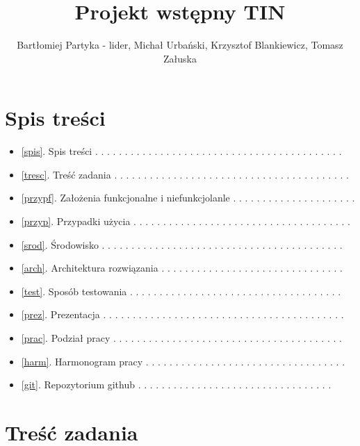 \documentclass{article}
\author{Bartłomiej Partyka - lider, Michał Urbański, Krzysztof Blankiewicz, Tomasz Załuska}
\title{Projekt wstępny TIN}
\begin{document}
\maketitle

\section{Spis treści\label{spis}}

\begin{itemize}

    \item \ref{spis}. Spis treści . . . . . . . . . . . . . . . . . . . . . . . . . . . . . . . . . . . . . . . . . . \pageref{spis}
    \item \ref{tresc}. Treść zadania . . . . . . . . . . . . . . . . . . . . . . . . . . . . . . . . . . . . . . . . \pageref{tresc}
    \item \ref{przypf}. Założenia funkcjonalne i niefunkcjolanle . . . . . . . . . . . . . . . . . . . . . \pageref{przypf}
    \item \ref{przyp}. Przypadki użycia . . . . . . . . . . . . . . . . . . . . . . . . . . . . . . . . . . . . . \pageref{przyp}
    \item \ref{srod}. Środowisko . . . . . . . . . . . . . . . . . . . . . . . . . . . . . . . . . . . . . . . . . \pageref{srod}
    \item \ref{arch}. Architektura rozwiązania . . . . . . . . . . . . . . . . . . . . . . . . . . . . . . . \pageref{arch}
    \item \ref{test}. Sposób testowania . . . . . . . . . . . . . . . . . . . . . . . . . . . . . . . . . . . . \pageref{test}
    \item \ref{prez}. Prezentacja . . . . . . . . . . . . . . . . . . . . . . . . . . . . . . . . . . . . . . . . . \pageref{prez}
    \item \ref{prac}. Podział pracy . . . . . . . . . . . . . . . . . . . . . . . . . . . . . . . . . . . . . . . \pageref{prac}
    \item \ref{harm}. Harmonogram pracy . . . . . . . . . . . . . . . . . . . . . . . . . . . . . . . . . . \pageref{harm}
    \item \ref{git}. Repozytorium github . . . . . . . . . . . . . . . . . . . . . . . . . . . . . . . . . \pageref{git}


\end{itemize}

\section{Treść zadania\label{tresc}}
\end{document}

